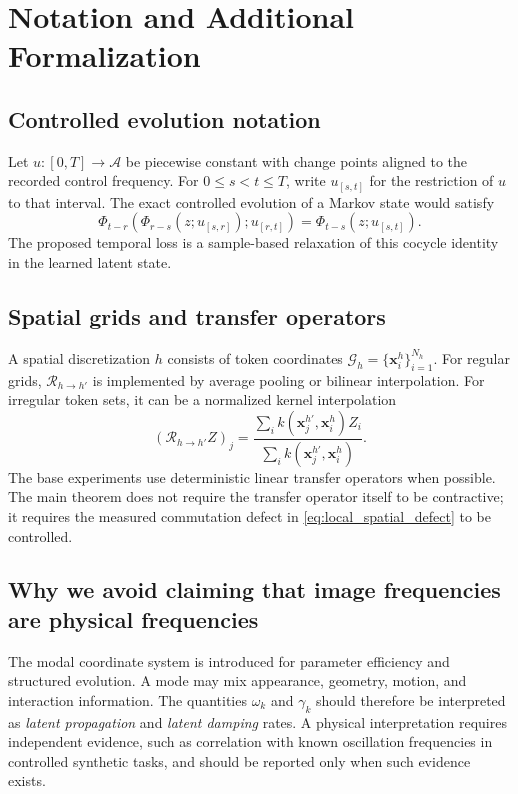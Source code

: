 \documentclass{article}
\theoremstyle{plain}
\theoremstyle{definition}
\theoremstyle{remark}
\newcommand{\Aspace}{\mathcal{A}}
\newcommand{\PhiOp}{\Phi}
\newcommand{\Restr}{\mathcal{R}}
\begin{document}
\clearpage



\newpage
\appendix
\onecolumn

\section{Notation and Additional Formalization}
\label{app:notation}

\subsection{Controlled evolution notation}
Let $u:[0,T]\rightarrow\Aspace$ be piecewise constant with change points aligned to the recorded control frequency. For $0\le s<t\le T$, write $u_{[s,t]}$ for the restriction of $u$ to that interval. The exact controlled evolution of a Markov state would satisfy
\begin{equation}
\PhiOp_{t-r}(\PhiOp_{r-s}(z;u_{[s,r]});u_{[r,t]})
=\PhiOp_{t-s}(z;u_{[s,t]}).
\end{equation}
The proposed temporal loss is a sample-based relaxation of this cocycle identity in the learned latent state.

\subsection{Spatial grids and transfer operators}
A spatial discretization $h$ consists of token coordinates $\mathcal{G}_h=\{\mathbf{x}_i^h\}_{i=1}^{N_h}$. For regular grids, $\Restr_{h\rightarrow h'}$ is implemented by average pooling or bilinear interpolation. For irregular token sets, it can be a normalized kernel interpolation
\begin{equation}
(\Restr_{h\rightarrow h'}Z)_j
=
\frac{\sum_i k(\mathbf{x}^{h'}_j,\mathbf{x}^h_i)Z_i}
{\sum_i k(\mathbf{x}^{h'}_j,\mathbf{x}^h_i)}.
\end{equation}
The base experiments use deterministic linear transfer operators when possible. The main theorem does not require the transfer operator itself to be contractive; it requires the measured commutation defect in \cref{eq:local_spatial_defect} to be controlled.

\subsection{Why we avoid claiming that image frequencies are physical frequencies}
The modal coordinate system is introduced for parameter efficiency and structured evolution. A mode may mix appearance, geometry, motion, and interaction information. The quantities $\omega_k$ and $\gamma_k$ should therefore be interpreted as \emph{latent propagation} and \emph{latent damping} rates. A physical interpretation requires independent evidence, such as correlation with known oscillation frequencies in controlled synthetic tasks, and should be reported only when such evidence exists.
\end{document}
